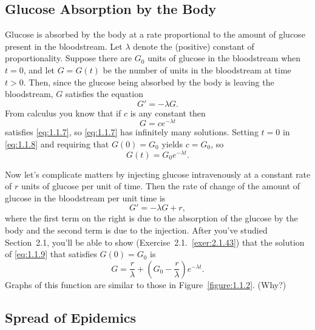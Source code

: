 \documentclass{ximera}
\begin{document}
\subsection*{Glucose Absorption by the Body}

\noindent
Glucose is absorbed by
the body at a rate proportional to the amount of glucose present in
the bloodstream. Let $\lambda$ denote the (positive) constant of
proportionality. Suppose   there are $G_0$ units of glucose in
the bloodstream when $t=0$, and let $G=G(t)$ be the number of units in
the bloodstream at time $t>0$. Then, since the glucose being absorbed
by the body is leaving the bloodstream, $G$ satisfies the equation
\begin{equation} \label{eq:1.1.7}
G'=-\lambda G.
\end{equation}
From  calculus you know that if $c$ is any constant then
\begin{equation} \label{eq:1.1.8}
G=ce^{-\lambda t}
\end{equation}
satisfies \eqref{eq:1.1.7}, so \eqref{eq:1.1.7} has infinitely
many solutions.
 Setting $t=0$ in \eqref{eq:1.1.8} and requiring that
$G(0)=G_0$ yields $c=G_0$, so
$$
G(t)=G_0e^{-\lambda t}.
$$

Now let's complicate matters by injecting glucose intravenously
at a constant rate of $r$ units of glucose per unit of time.
Then the rate of change of the amount of glucose  in the bloodstream
per unit time is
\begin{equation} \label{eq:1.1.9}
G'=-\lambda G+r,
\end{equation}
where the first term on the right is due to the absorption of the
glucose by the body and the second term is due to the injection.
 After you've studied Section~2.1,
you'll be able to show (Exercise~2.1.~\hspace*{-3pt}\ref{exer:2.1.43}) that the solution
of
\eqref{eq:1.1.9} that satisfies $G(0)=G_0$ is
$$
G=\frac{r}{\lambda}+\left(G_0-\frac{r}{\lambda}\right)e^{-\lambda t}.
$$
Graphs of  this function are similar to those in
Figure~\ref{figure:1.1.2}.
(Why?)


\subsection*{Spread of Epidemics}
\end{document}
